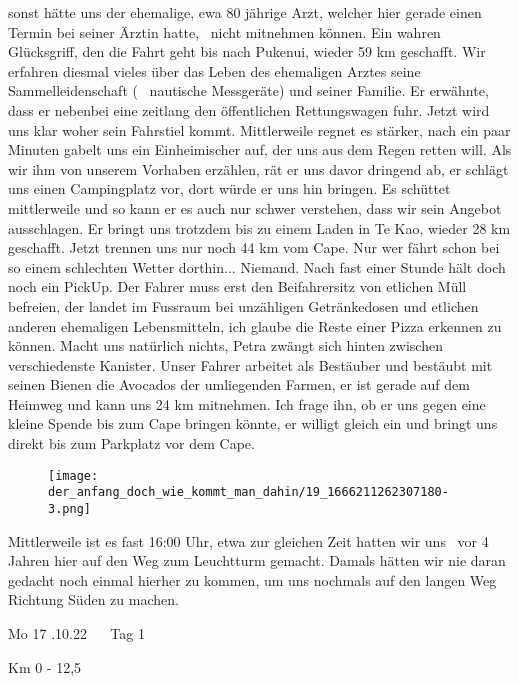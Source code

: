   sonst hätte uns der ehemalige, ewa 80 jährige Arzt, welcher hier gerade einen Termin bei seiner Ärztin hatte,  nicht mitnehmen können. Ein wahren Glücksgriff, den die Fahrt geht bis nach Pukenui, wieder 59 km geschafft. Wir erfahren diesmal vieles über das Leben des ehemaligen Arztes seine Sammelleidenschaft (  nautische Messgeräte) und seiner Familie. Er erwähnte, dass er nebenbei eine zeitlang den öffentlichen Rettungswagen fuhr. Jetzt wird uns klar woher sein Fahrstiel kommt. Mittlerweile regnet es stärker, nach ein paar Minuten gabelt uns ein Einheimischer auf, der uns aus dem Regen retten will. Als wir ihm von unserem Vorhaben erzählen, rät er uns davor dringend ab, er schlägt uns einen Campingplatz vor, dort würde er uns hin bringen. Es schüttet mittlerweile und so kann er es auch nur schwer verstehen, dass wir sein Angebot ausschlagen. Er bringt uns trotzdem bis zu einem Laden in Te Kao, wieder 28 km geschafft. Jetzt trennen uns nur noch 44 km vom Cape. Nur wer fährt schon bei so einem schlechten Wetter dorthin... Niemand. Nach fast einer Stunde hält doch noch ein PickUp. Der Fahrer muss erst den Beifahrersitz von etlichen Müll befreien, der landet im Fussraum bei unzähligen Getränkedosen und etlichen anderen ehemaligen Lebensmitteln, ich glaube die Reste einer Pizza erkennen zu können. Macht uns natürlich nichts, Petra zwängt sich hinten zwischen verschiedenste Kanister. Unser Fahrer arbeitet als Bestäuber und bestäubt mit seinen Bienen die Avocados der umliegenden Farmen, er ist gerade auf dem Heimweg und kann uns 24 km mitnehmen. Ich frage ihn, ob er uns gegen eine kleine Spende bis zum Cape bringen könnte, er willigt gleich ein und bringt uns direkt bis zum Parkplatz vor dem Cape.
 


\begin{figure}[H]
	\centering
	\texttt{[image: der\_anfang\_doch\_wie\_kommt\_man\_dahin/19\_1666211262307180-3.png]}
	\caption{}
	\label{fig:19_1666211262307180-3}
\end{figure}

  Mittlerweile ist es fast 16:00 Uhr, etwa zur gleichen Zeit hatten wir uns  vor 4 Jahren hier auf den Weg zum Leuchtturm gemacht. Damals hätten wir nie daran gedacht noch einmal hierher zu kommen, um uns nochmals auf den langen Weg Richtung Süden zu machen.
 


  Mo 17 .10.22    Tag 1
 


  Km 0 - 12,5
 


